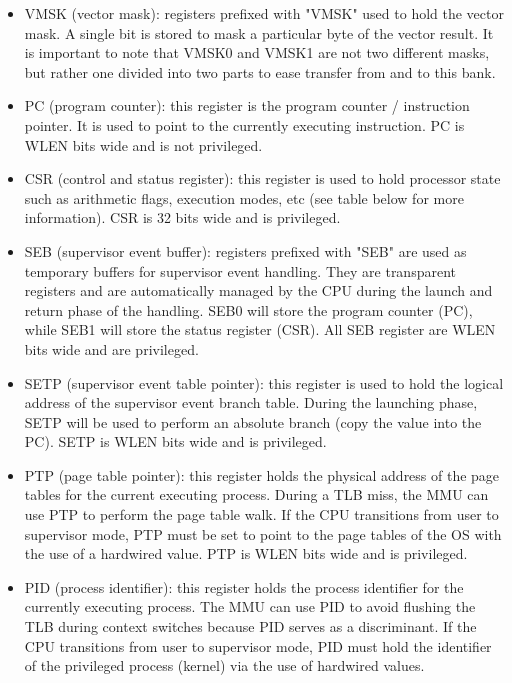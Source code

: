 \documentclass{article}
\begin{document}
\begin{itemize}
                    \item VMSK (vector mask): registers prefixed with "VMSK" used to hold the vector mask. A single bit is stored to mask a particular byte of the vector result. It is important to note that VMSK0 and VMSK1 are not two different masks, but rather one divided into two parts to ease transfer from and to this bank.

                    \item PC (program counter): this register is the program counter / instruction pointer. It is used to point to the currently executing instruction. PC is WLEN bits wide and is not privileged.

                    \item CSR (control and status register): this register is used to hold processor state such as arithmetic flags, execution modes, etc (see table below for more information). CSR is 32 bits wide and is privileged.

                    \item SEB (supervisor event buffer): registers prefixed with "SEB" are used as temporary buffers for supervisor event handling. They are transparent registers and are automatically managed by the CPU during the launch and return phase of the handling. SEB0 will store the program counter (PC), while SEB1 will store the status register (CSR). All SEB register are WLEN bits wide and are privileged.

                    \item SETP (supervisor event table pointer): this register is used to hold the logical address of the supervisor event branch table. During the launching phase, SETP will be used to perform an absolute branch (copy the value into the PC). SETP is WLEN bits wide and is privileged.

                    \item PTP (page table pointer): this register holds the physical address of the page tables for the current executing process. During a TLB miss, the MMU can use PTP to perform the page table walk. If the CPU transitions from user to supervisor mode, PTP must be set to point to the page tables of the OS with the use of a hardwired value. PTP is WLEN bits wide and is privileged.

                    \item PID (process identifier): this register holds the process identifier for the currently executing process. The MMU can use PID to avoid flushing the TLB during context switches because PID serves as a discriminant. If the CPU transitions from user to supervisor mode, PID must hold the identifier of the privileged process (kernel) via the use of hardwired values.


\end{itemize}
\end{document}
